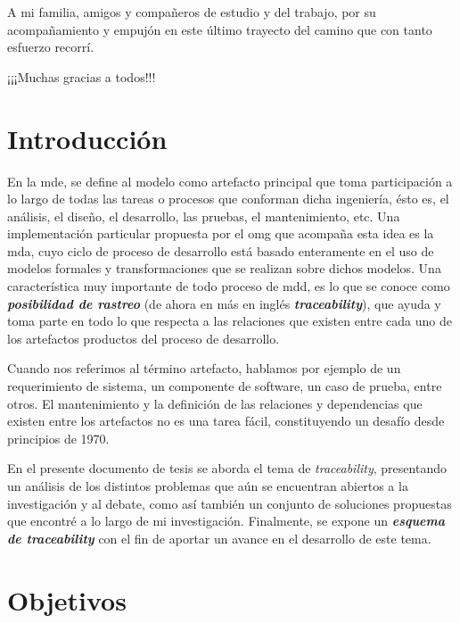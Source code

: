 \documentclass[a4paper,12pt,oneside,spanish]{book}
\begin{document}
\bigskip

A mi familia, amigos y compañeros de estudio y del trabajo, por su acompañamiento y empujón en este último trayecto del camino que con tanto esfuerzo recorrí.

\bigskip

¡¡¡Muchas gracias a todos!!!



\chapter{Introducción}


En la \gls{mde}, se define al modelo como artefacto principal que toma participación a lo largo de todas las tareas o procesos que conforman dicha ingeniería, ésto es, el análisis, el diseño, el desarrollo, las pruebas, el mantenimiento, etc. Una implementación particular propuesta por el \gls{omg} que acompaña esta idea es la \gls{mda}, cuyo ciclo de proceso de desarrollo está basado enteramente en el uso de modelos formales y transformaciones que se realizan sobre dichos modelos. Una característica muy importante de todo proceso de \gls{mdd}, es lo que se conoce como \textit{\textbf{posibilidad de rastreo}} (de ahora en más en inglés \textit{\textbf{traceability}}), que ayuda y toma parte en todo lo que respecta a las relaciones que existen entre cada uno de los artefactos productos del proceso de desarrollo.

Cuando nos referimos al término artefacto, hablamos por ejemplo de un requerimiento de sistema, un componente de software, un caso de prueba, entre otros. El mantenimiento y la definición de las relaciones y dependencias que existen entre los artefactos no es una tarea fácil, constituyendo un desafío desde principios de 1970.

En el presente documento de tesis se aborda el tema de \textit{traceability}, presentando un análisis de los distintos problemas que aún se encuentran abiertos a la investigación y al debate, como así también un conjunto de soluciones propuestas que encontré a lo largo de mi investigación. Finalmente, se expone un \textit{\textbf{esquema de traceability}} con el fin de aportar un avance en el desarrollo de este tema.




\chapter{Objetivos}
\end{document}
